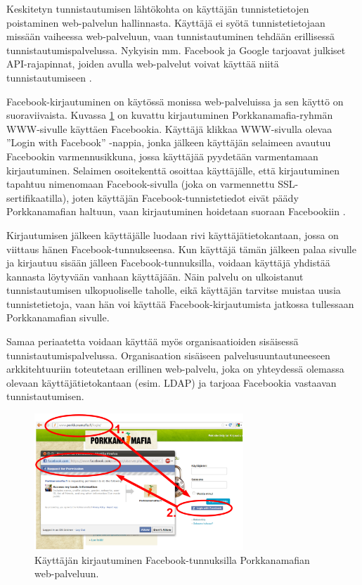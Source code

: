 Keskitetyn tunnistautumisen lähtökohta on käyttäjän tunnistetietojen poistaminen web-palvelun hallinnasta. Käyttäjä ei syötä tunnistetietojaan missään vaiheessa web-palveluun, vaan tunnistautuminen tehdään erillisessä tunnistautumispalvelussa. Nykyisin mm. Facebook ja Google tarjoavat julkiset API-rajapinnat, joiden avulla web-palvelut voivat käyttää niitä tunnistautumiseen \cite{facebook}.

Facebook-kirjautuminen on käytössä monissa web-palveluissa ja sen käyttö on suoraviivaista. Kuvassa \ref{facebook_login} on kuvattu kirjautuminen Porkkanamafia-ryhmän WWW-sivulle käyttäen Facebookia. Käyttäjä klikkaa WWW-sivulla olevaa ''Login with Facebook'' -nappia, jonka jälkeen käyttäjän selaimeen avautuu Facebookin varmennusikkuna, jossa käyttäjää pyydetään varmentamaan kirjautuminen. Selaimen osoitekenttä osoittaa käyttäjälle, että kirjautuminen tapahtuu nimenomaan Facebook-sivulla (joka on varmennettu SSL-sertifikaatilla), joten käyttäjän Facebook-tun\-nis\-te\-tie\-dot eivät päädy Porkkanamafian haltuun, vaan kirjautuminen hoidetaan suoraan Facebookiin \cite{facebook}.

Kirjautumisen jälkeen käyttäjälle luodaan rivi käyttäjätietokantaan, jossa on viittaus hänen Facebook-tunnukseensa. Kun käyttäjä tämän jälkeen palaa sivulle ja kirjautuu sisään jälleen Facebook-tunnuksilla, voidaan käyttäjä yhdistää kannasta löytyvään vanhaan käyttäjään. Näin palvelu on ulkoistanut tunnistautumisen ulkopuoliselle taholle, eikä käyttäjän tarvitse muistaa uusia tunnistetietoja, vaan hän voi käyttää Facebook-kirjautumista jatkossa tullessaan Porkkanamafian sivulle.

Samaa periaatetta voidaan käyttää myös organisaatioiden sisäisessä tunnistautumispalvelussa. Organisaation sisäiseen palvelusuuntautuneeseen arkkitehtuuriin toteutetaan erillinen web-palvelu, joka on yhteydessä olemassa olevaan käyttäjätietokantaan (esim. LDAP) ja tarjoaa Facebookia vastaavan tunnistautumisen.

\begin{figure}[ht]
\centering
\includegraphics[width=0.7\textwidth]{teknologiat/facebook.eps}
\caption{Käyttäjän kirjautuminen Facebook-tunnuksilla Porkkanamafian web-palveluun.}%
\label{facebook_login}
\end{figure}